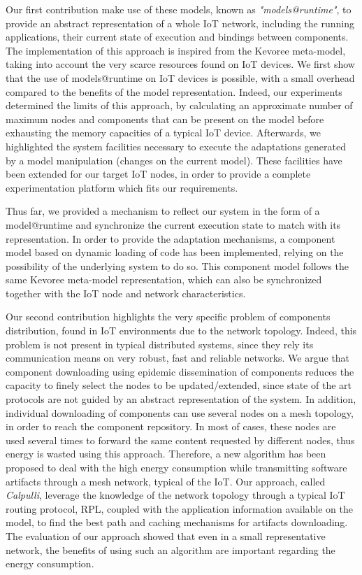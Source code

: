 Our first contribution make use of these models, known as \textit{"models@runtime"}, to provide an abstract representation of a whole IoT network, including the running applications, their current state of execution and bindings between components.
The implementation of this approach is inspired from the Kevoree meta-model, taking into account the very scarce resources found on IoT devices.
We first show that the use of models@runtime on IoT devices is possible, with a small overhead compared to the benefits of the model representation.
Indeed, our experiments determined the limits of this approach, by calculating an approximate number of maximum nodes and components that can be present on the model before exhausting the memory capacities of a typical IoT device.
Afterwards, we highlighted the system facilities necessary to execute the adaptations generated by a model manipulation (changes on the current model).
These facilities have been extended for our target IoT nodes, in order to provide a complete experimentation platform which fits our requirements.

Thus far, we provided a mechanism to reflect our system in the form of a model@runtime and synchronize the current execution state to match with its representation.
In order to provide the adaptation mechanisms, a component model based on dynamic loading of code has been implemented, relying on the possibility of the underlying system to do so.
This component model follows the same Kevoree meta-model representation, which can also be synchronized together with the IoT node and network characteristics.

Our second contribution highlights the very specific problem of components distribution, found in IoT environments due to the network topology.
Indeed, this problem is not present in typical distributed systems, since they rely its communication means on very robust, fast and reliable networks.
We argue that component downloading using epidemic dissemination of components reduces the capacity to finely select the nodes to be updated/extended, since state of the art protocols are not guided by an abstract representation of the system.
In addition, individual downloading of components can use several nodes on a mesh topology, in order to reach the component repository.
In most of cases, these nodes are used several times to forward the same content requested by different nodes, thus energy is wasted using this approach.
Therefore, a new algorithm has been proposed to deal with the high energy consumption while transmitting software artifacts through a mesh network, typical of the IoT.
Our approach, called \textit{Calpulli}, leverage the knowledge of the network topology through a typical IoT routing protocol, RPL, coupled with the application information available on the model, to find the best path and caching mechanisms for artifacts downloading.
The evaluation of our approach showed that even in a small representative network, the benefits of using such an algorithm are important regarding the energy consumption.

